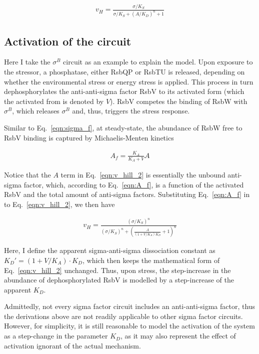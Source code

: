 \begin{align}
    v_H = \frac{\sigma/K_S}{\sigma/K_S + (A/K_D)^n + 1}
\end{align}

\subsection{Activation of the circuit}

Here I take the $\sigma^B$ circuit as an example to explain the model.
Upon exposure to the stressor,
a phosphatase, either RsbQP or RsbTU is released, depending on whether the
environmental stress or energy stress is applied.
This process in turn dephosphorylates the anti-anti-sigma factor RsbV to
its activated form (which the activated from is denoted by $V$).
RsbV competes the binding of RsbW with $\sigma^B$, which releases
$\sigma^B$ and, thus, triggers the stress response.

Similar to Eq.~\ref{eqn:sigma_f}, at steady-state,
the abundance of RsbW free to RsbV binding is captured 
by Michaelis-Menten kinetics

\begin{align}
    \label{eqn:A_f}
    A_f = \frac{K_A}{K_A + V}A
\end{align}

Notice that the $A$ term in Eq.~\ref{eqn:v_hill_2} is essentially the unbound
anti-sigma factor, which, according to Eq.~\ref{eqn:A_f},
is a function of the activated RsbV and 
the total amount of anti-sigma factors.
Substituting Eq.~\ref{eqn:A_f} in to Eq.~\ref{eqn:v_hill_2}, we then have

\begin{align}
    v_H = \frac{(\sigma/K_S)^n}
        {(\sigma/K_S)^n + \left(\frac{A}{(1 + V/K_A)K_D} + 1\right)^n}
\end{align}

Here, I define the apparent sigma-anti-sigma dissociation constant as
$K_D' = (1 + V/K_A)\cdot K_D$, which then keeps the mathematical form
of Eq.~\ref{eqn:v_hill_2} unchanged.
Thus, upon stress, the step-increase in the
abundance of dephosphorylated RsbV is modelled by a step-increase
of the apparent $K_D$.

Admittedly, not every sigma factor circuit includes an anti-anti-sigma factor,
thus the derivations above are not readily applicable to other 
sigma factor circuits.
However, for simplicity, it is still reasonable to model the activation
of the system as a step-change in the parameter $K_D$,
as it may also represent the effect of activation
ignorant of the actual mechanism.



